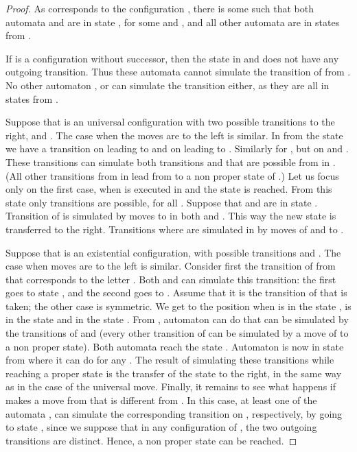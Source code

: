\documentclass{LMCS}
\theoremstyle{plain}\newtheorem{remark}{Remark}
\theoremstyle{plain}\newtheorem{lemma}[thm]{Lemma}
\begin{document}
\begin{proof}
  As  corresponds to the configuration , there is some 
  such that both automata  and  are in state ,
  for some  and , and all other automata are in
  states from .

  If  is a configuration without successor, then the state  in
   and  does not have any outgoing transition. Thus
  these automata cannot simulate the  transition of  from
  . No other automaton , or  can simulate the
   transition either, as they are all in states from .

  Suppose that  is an universal configuration with two possible
  transitions to the right,  and . The
  case when the moves are to the left is similar. In  from the
  state  we have a transition on  leading to  and on
   leading to . Similarly for , but on
   and . These transitions can simulate both
  transitions  and 
  that are possible from  in . (All other transitions from  in
   lead from  to a non proper state of .) Let us focus
  only on the first case, when  is executed in 
  and the state  is reached. From this state only 
  transitions  are possible, for all . Suppose that  and  are in state
  . Transition  of  is simulated by moves
  to  in both  and .  This way the new
  state is transferred to the right.  Transitions 
  where  are simulated in  by moves of 
  and  to . 

  Suppose that  is an existential configuration, with possible
  transitions  and . The case when moves
  are to the left is similar.  Consider first the transition of 
  from  that corresponds to the letter .  Both 
  and  can simulate this transition: the first goes to state
  , and the second goes to . Assume that it is the
  transition of  that is taken; the other case is
  symmetric. We get to the position when  is in the state
  ,  is in the state  and  in the
  state . From , automaton  can do
   that can be simulated by the transitions of
   and  (every other transition of  can be
  simulated by a move of  to a non proper state).  Both
  automata reach the state . Automaton  is now in state
   from where it can do  for any . The
  result of simulating these transitions while reaching a proper state
  is the transfer of the state to the right, in the same way as in the
  case of the universal move. Finally, it remains to see what happens
  if  makes a move from  that is different from .  In
  this case, at least one of the automata ,  can
  simulate the corresponding transition on , 
  respectively, by going to state , since we suppose that in any
  configuration of , the two outgoing transitions are
  distinct. Hence, a non proper state can be reached.
\end{proof}
\end{document}
